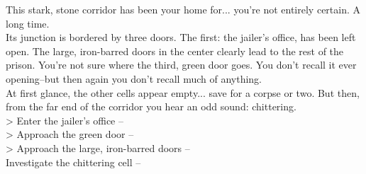This stark, stone corridor has been your home for... you’re not entirely certain. A long time.\\

Its junction is bordered by three doors. The first: the jailer’s office, has been left open. The large, iron-barred doors in the center clearly lead to the rest of the prison. You’re not sure where the third, green door goes. You don’t recall it ever opening--but then again you don’t recall much of anything.\\

At first glance, the other cells appear empty... save for a corpse or two. But then, from the far end of the corridor you hear an odd sound: chittering.\\

> Enter the jailer’s office -- \\
> Approach the green door -- \\
> Approach the large, iron-barred doors -- \\
 Investigate the chittering cell -- 
